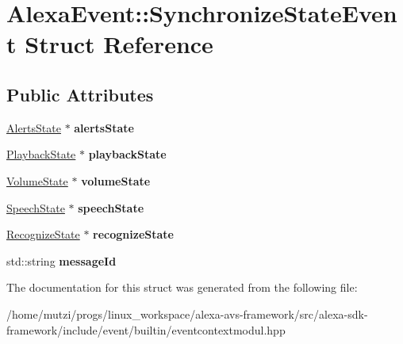 \hypertarget{structAlexaEvent_1_1SynchronizeStateEvent}{}\section{Alexa\+Event\+:\+:Synchronize\+State\+Event Struct Reference}
\label{structAlexaEvent_1_1SynchronizeStateEvent}
\subsection*{Public Attributes}
\begin{DoxyCompactItemize}
\item 
\mbox{\label{structAlexaEvent_1_1SynchronizeStateEvent_a12a439abb828c10c7c2a9d4a569bdead}} 
\hyperlink{classAlexaEvent_1_1AlertsState}{Alerts\+State} $\ast$ {\bfseries alerts\+State}
\item 
\mbox{\label{structAlexaEvent_1_1SynchronizeStateEvent_abd23fe820641aa0078b8e46430cf5c10}} 
\hyperlink{classAlexaEvent_1_1PlaybackState}{Playback\+State} $\ast$ {\bfseries playback\+State}
\item 
\mbox{\label{structAlexaEvent_1_1SynchronizeStateEvent_a0706fd34f6cbfd51debcd278f4eb0c89}} 
\hyperlink{classAlexaEvent_1_1VolumeState}{Volume\+State} $\ast$ {\bfseries volume\+State}
\item 
\mbox{\label{structAlexaEvent_1_1SynchronizeStateEvent_abd25ab3b2ba9b51b06b11a31f738e1c5}} 
\hyperlink{classAlexaEvent_1_1SpeechState}{Speech\+State} $\ast$ {\bfseries speech\+State}
\item 
\mbox{\label{structAlexaEvent_1_1SynchronizeStateEvent_a5e94f93bb597d88326f66d8271a437c3}} 
\hyperlink{classAlexaEvent_1_1RecognizeState}{Recognize\+State} $\ast$ {\bfseries recognize\+State}
\item 
\mbox{\label{structAlexaEvent_1_1SynchronizeStateEvent_ae41e83389df4e34fab008579a3cf7ddd}} 
std\+::string {\bfseries message\+Id}
\end{DoxyCompactItemize}


The documentation for this struct was generated from the following file\+:\begin{DoxyCompactItemize}
\item 
/home/mutzi/progs/linux\+\_\+workspace/alexa-\/avs-\/framework/src/alexa-\/sdk-\/framework/include/event/builtin/eventcontextmodul.\+hpp\end{DoxyCompactItemize}
